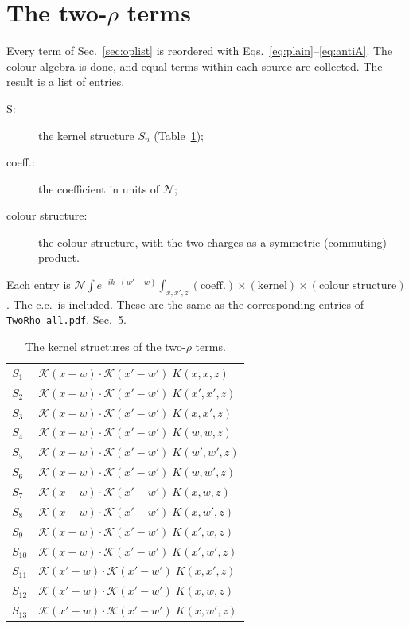 \documentclass[10pt]{article}
\numberwithin{equation}{section}
\newcommand{\KK}{\mathcal K}
\newcommand{\NN}{\mathcal N}
\begin{document}
\section{The two-\texorpdfstring{$\rho$}{rho} terms}\label{sec:two}
Every term of Sec.~\ref{sec:oplist} is reordered with Eqs.~\eqref{eq:plain}--\eqref{eq:antiA}. The colour algebra is done, and equal terms within each source are collected. The result is a list of entries.
\begin{description}
\item[S:] the kernel structure $S_n$ (Table~\ref{tab:struct});
\item[coeff.:] the coefficient in units of $\NN$;
\item[colour structure:] the colour structure, with the two charges as a symmetric (commuting) product.
\end{description}
Each entry is $\NN\int e^{-ik\cdot(w'-w)}\int_{x,x',z}(\text{coeff.})\times(\text{kernel})\times(\text{colour structure})$. The c.c.\ is included. These are the same as the corresponding entries of \texttt{TwoRho\_all.pdf}, Sec.~5.
\begin{table}[H]
\centering\small
\begin{tabular}{@{}l l@{}}
$S_{1}$ & $\KK(x-w)\cdot\KK(x'-w')\;K(x,x,z)$\\
$S_{2}$ & $\KK(x-w)\cdot\KK(x'-w')\;K(x',x',z)$\\
$S_{3}$ & $\KK(x-w)\cdot\KK(x'-w')\;K(x,x',z)$\\
$S_{4}$ & $\KK(x-w)\cdot\KK(x'-w')\;K(w,w,z)$\\
$S_{5}$ & $\KK(x-w)\cdot\KK(x'-w')\;K(w',w',z)$\\
$S_{6}$ & $\KK(x-w)\cdot\KK(x'-w')\;K(w,w',z)$\\
$S_{7}$ & $\KK(x-w)\cdot\KK(x'-w')\;K(x,w,z)$\\
$S_{8}$ & $\KK(x-w)\cdot\KK(x'-w')\;K(x,w',z)$\\
$S_{9}$ & $\KK(x-w)\cdot\KK(x'-w')\;K(x',w,z)$\\
$S_{10}$ & $\KK(x-w)\cdot\KK(x'-w')\;K(x',w',z)$\\
$S_{11}$ & $\KK(x'-w)\cdot\KK(x'-w')\;K(x,x',z)$\\
$S_{12}$ & $\KK(x'-w)\cdot\KK(x'-w')\;K(x,w,z)$\\
$S_{13}$ & $\KK(x'-w)\cdot\KK(x'-w')\;K(x,w',z)$\\
\end{tabular}
\caption{The kernel structures of the two-$\rho$ terms.}
\label{tab:struct}
\end{table}
\end{document}
